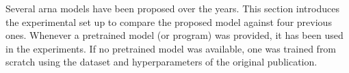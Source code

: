 
Several \gls{arna} models have been proposed over the years.
This section introduces the experimental set up to compare
the proposed model against four previous ones. Whenever a
pretrained model (or program) was provided, it has been used
in the experiments. If no pretrained model was available,
one was trained from scratch using the dataset and
hyperparameters of the original publication. 
